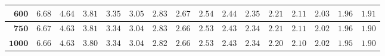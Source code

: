 \begin{customTableWrapper}{1.4}
\begin{longtable}{|r|r|r|r|r|r|r|r|r|r|r|r|r|r|r|r|}
    ${\mathbf{600}}$  & ${6.68}$   & ${4.64}$   & ${3.81}$   & ${3.35}$   & ${3.05}$   & ${2.83}$   & ${2.67}$   & ${2.54}$   & ${2.44}$   & ${2.35}$   & ${2.21}$   & ${2.11}$   & ${2.03}$   & ${1.96}$   & ${1.91}$   \\ \hline 
    ${\mathbf{750}}$  & ${6.67}$   & ${4.63}$   & ${3.81}$   & ${3.34}$   & ${3.04}$   & ${2.83}$   & ${2.66}$   & ${2.53}$   & ${2.43}$   & ${2.34}$   & ${2.21}$   & ${2.11}$   & ${2.02}$   & ${1.96}$   & ${1.90}$   \\ \hline 
    ${\mathbf{1000}}$  & ${6.66}$   & ${4.63}$   & ${3.80}$   & ${3.34}$   & ${3.04}$   & ${2.82}$   & ${2.66}$   & ${2.53}$   & ${2.43}$   & ${2.34}$   & ${2.20}$   & ${2.10}$   & ${2.02}$   & ${1.95}$   & ${1.90}$   \\ \hline 


\end{longtable}
\end{customTableWrapper}
\changefontsizes{11pt}

\setlength{\LTleft}{0in} %
\setlength{\LTright}{0in} %


\newpage

